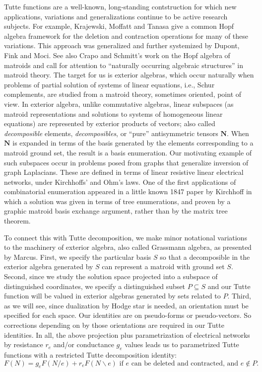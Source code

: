 \documentclass[Unicode]{cedram-alco}
\newcommand{\ext}[1]{\ensuremath{\mathbf{#1}}}
\begin{document}
Tutte functions are a well-known, long-standing contstruction
for which new applications, variations and generalizations
continue to be active research subjects. For example,
Krajewski, Moffatt and Tanasa give a common Hopf algebra framework
for the deletion and contraction operations for many of
these variations\cite{KRAJEWSKI2018271}.
This approach was generalized and further systemized by
Dupont, Fink and Moci\cite{UnivTutteCharCombCoalgDupontFinkMoci}.
See also Crapo and Schmitt's work
on the Hopf algebra of matroids and call
for attention to ``naturally occurring algebraic
structures'' in matroid theory\cite{CRAPO20051066}.  The target for us
is exterior algebras, which occur naturally when problems of
partial solution of systems of linear equations\cite{ExteriorAlgInLinalgRef},
i.e., Schur complements,
are studied from a matroid theory, sometimes oriented, point of view.
In exterior algebra, unlike commutative algebras,
linear subspaces (as matroid representations and
solutions to systems of homogeneous linear equations)
are represented by exterior products of vectors; also called
\emph{decomposible} elements, \emph{decomposibles},
or ``pure'' antisymmetric tensors $\ext{N}$.
When $\ext{N}$ is expanded in terms of the basis
generated by the elements corresponding to a matroid
ground set, the result is a basis enumeration.
Our motivating example of such subspaces occur
in problems posed from graphs that generalize inversion
of graph Laplacians.  These are defined in
terms of linear resistive linear electrical networks,
under Kirchhoffs' and Ohm's laws.  One of the
first applications of combinatorial enumeration
appeared in a little known 1847 paper by Kirchhoff\cite{Kirchhoff}
in which a solution was given in terms of tree enumerations,
and proven by a graphic matroid basis exchange argument, rather
than by the matrix tree theorem.

To connect this with Tutte decomposition, we make
minor notational variations to the machinery of exterior algebra,
also called Grassmann algebra,
as presented by Marcus\cite{MarcusFDMuAlPt2}.  First, we specify the particular basis $S$
so that a decomposible in the exterior algebra generated by $S$
can represent a matroid with ground set $S$.
Second, since we study the solution space projected
into a subspace of distinguished coordinates, we
specify a distinguished subset $P\subseteq S$
and our Tutte function will be valued in exterior algebras generated by sets related to $P$.
Third, as we will see, since dualization by Hodge star is needed,
an orientation must be specified for each space.
Our identities are on pseudo-forms or pseudo-vectors\cite{Frankel}.
So corrections depending on by those orientations
are required in our Tutte identities.  In all, the above projection plus
parametrization of
electrical networks by resistance $r_e$ and/or conductance $g_e$ values
leads us to parametrized Tutte functions with a
restricted Tutte decomposition identity:
\begin{equation}\label{ParamTutteEqGeneric}
   F(N) = g_eF(N/e)+r_eF(N\backslash e) \text{ if\ }e\text{ can be deleted and contracted, and }e\not\in P.
\end{equation}
\end{document}
